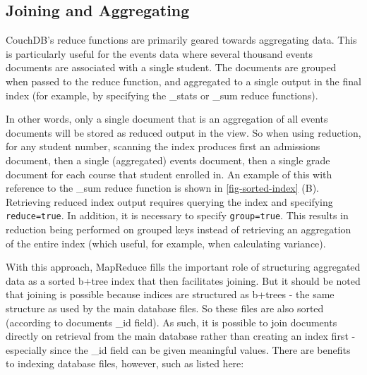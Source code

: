 \subsection{Joining and Aggregating}
CouchDB's reduce functions are primarily geared towards aggregating data. This is particularly useful for the events data where several thousand events documents are associated with a single student. The documents are grouped when passed to the reduce function, and aggregated to a single output in the final index (for example, by specifying the \_stats or \_sum reduce functions).

In other words, only a single document that is an aggregation of all events documents will be stored as reduced output in the view. So when using reduction, for any student number, scanning the index produces first an admissions document, then a single (aggregated) events document, then a single grade document for each course that student enrolled in. An example of this with reference to the \_sum reduce function is shown in \ref{fig-sorted-index} (B). Retrieving reduced index output requires querying the index and specifying \texttt{reduce=true}. In addition, it is necessary to specify \texttt{group=true}. This results in reduction being performed on grouped keys instead of retrieving an aggregation of the entire index (which useful, for example, when calculating variance).



With this approach, MapReduce fills the important role of structuring aggregated data as a sorted b+tree index that then facilitates joining. But it should be noted that joining is possible because indices are structured as b+trees - the same structure as used by the main database files. So these files are also sorted (according to documents \_id field). As such, it is possible to join documents directly on retrieval from the main database rather than creating an index first - especially since the \_id field can be given meaningful values. There are benefits to indexing database files, however, such as listed here:

